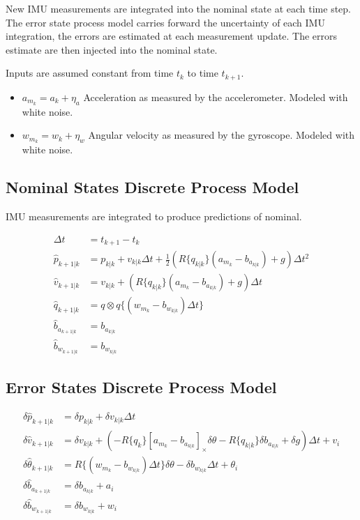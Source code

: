 \documentclass[]{article}
\begin{document}
New IMU measurements are integrated into the nominal state at each time step. The error state process model carries forward the uncertainty of each IMU integration, the errors are estimated at each measurement update. The errors estimate are then injected into the nominal state.

Inputs are assumed constant from time $t_{k}$ to time $t_{k+1}$.

\begin{itemize}
	\item $a_{m_k} = a_k + \eta_{a}$ Acceleration as measured by the accelerometer. Modeled with white noise.
	\item $w_{m_k} = w_k + \eta_{w}$ Angular velocity as measured by the gyroscope. Modeled with white noise.
\end{itemize}

\subsection{Nominal States Discrete Process Model}

IMU measurements are integrated to produce predictions of nominal.

\begin{align}
\Delta t &= t_{k+1} - t_{k} \\
\hat{p}_{k+1|k} &= p_{k|k} + v_{k|k} \Delta t + \frac{1}{2}(R\{q_{k|k}\}(a_{m_k} - b_{a_{k|k}}) + g) \Delta t^2 \\
\hat{v}_{k+1|k} &=  v_{k|k} + (R\{q_{k|k}\}(a_{m_k} - b_{a_{k|k}}) + g) \Delta t \\
\hat{q}_{k+1|k} &= q \otimes q\{(w_{m_k} - b_{w_{k|k}}) \Delta t\} \\
\hat{b}_{a_{k+1|k}} &= b_{a_{k|k}} \\
\hat{b}_{w_{k+1|k}} &= b_{w_{k|k}}
\end{align}

\subsection{Error States Discrete Process Model}
\begin{align}
\delta \hat{p}_{k+1|k} &= \delta p_{k|k} + \delta v_{k|k} \Delta t \\
\delta \hat{v}_{k+1|k} &= \delta v_{k|k} + (-R\{q_k\}[a_{m_k} - b_{a_{k|k}}]_{\times} \delta \theta - R\{q_{k|k}\} \delta b_{a_{k|k}}  + \delta g) \Delta t  + v_i\\
\delta \hat{\theta}_{k+1|k} &= R\{(w_{m_k} - b_{w_{k|k}})\Delta t\} \delta \theta - \delta b_{w_{k|k}} \Delta t + \theta_{i}\\
\delta \hat{b}_{a_{k+1|k}} &= \delta b_{a_{k|k}} + a_i \\
\delta \hat{b}_{w_{k+1|k}} &= \delta b_{w_{k|k}} + w_i
\end{align}
\end{document}
